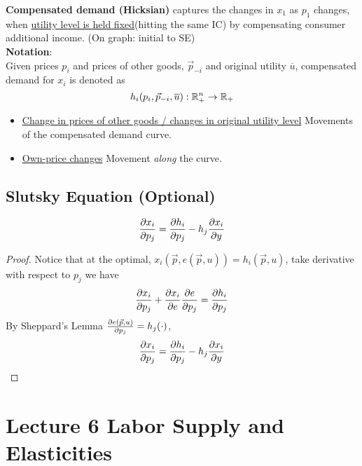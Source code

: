 \documentclass[]{article}
\begin{document}
            \begin{definition}
                \textbf{Compensated demand (Hicksian)} captures the changes in $x_1$ as $p_1$ changes, when \ul{utility level is held fixed}(hitting the same IC) by compensating consumer additional income. (On graph: initial to SE)
                \\\textbf{Notation}:
                \\Given prices $p_i$ and prices of other goods, $\vec{p}_{-i}$ and original utility $\overline{u}$, compensated demand for $x_i$ is denoted as
                \[
                    h_i(p_i, \vec{p}_{-i}, \overline{u}): \mathbb{R}^n_+ \rightarrow \mathbb{R}_+
                \]
            \end{definition}
            \begin{remark}
                \begin{itemize}
                    \item \ul{Change in prices of other goods / changes in original utility level} Movements of the compensated demand curve.
                    \item \ul{Own-price changes} Movement \emph{along} the curve.
                \end{itemize}
            \end{remark}
            
        \subsection{Slutsky Equation (Optional)}
        \begin{theorem}
            \[
                \frac{\partial{x_i}}{\partial{p_j}} = \frac{\partial{h_i}}{\partial{p_j}} - h_j \frac{\partial{x_i}}{\partial{y}}
            \]
        \end{theorem}
        \begin{proof}
            Notice that at the optimal, $x_i(\vec{p}, e(\vec{p}, u)) = h_i(\vec{p}, u)$, take derivative with respect to $p_j$ we have
            \[
                \frac{\partial{x_i}}{\partial{p_j}} + \frac{\partial{x_i}}{\partial{e}} \frac{\partial{e}}{\partial{p_j}} = \frac{\partial{h_i}}{\partial{p_j}}
            \]
            By Sheppard's Lemma $\frac{\partial{e(\vec{p}, u)}}{\partial{p_j}} = h_j(\cdot)$, 
            \[
                \frac{\partial{x_i}}{\partial{p_j}} = \frac{\partial{h_i}}{\partial{p_j}} - h_j \frac{\partial{x_i}}{\partial{y}}
            \]
        \end{proof}
    
    \section{Lecture 6 Labor Supply and Elasticities}
\end{document}
